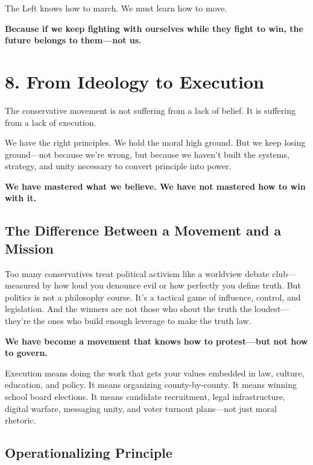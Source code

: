 The Left knows how to march. We must learn how to move.

\textbf{Because if we keep fighting with ourselves while they fight to win, the future belongs to them—not us.}














\section*{8. From Ideology to Execution}

The conservative movement is not suffering from a lack of belief. It is suffering from a lack of execution.

We have the right principles. We hold the moral high ground. But we keep losing ground—not because we’re wrong, but because we haven’t built the systems, strategy, and unity necessary to convert principle into power.

\textbf{We have mastered what we believe. We have not mastered how to win with it.}

\subsection*{The Difference Between a Movement and a Mission}

Too many conservatives treat political activism like a worldview debate club—measured by how loud you denounce evil or how perfectly you define truth. But politics is not a philosophy course. It’s a tactical game of influence, control, and legislation. And the winners are not those who shout the truth the loudest—they’re the ones who build enough leverage to make the truth law.

\textbf{We have become a movement that knows how to protest—but not how to govern.}

Execution means doing the work that gets your values embedded in law, culture, education, and policy. It means organizing county-by-county. It means winning school board elections. It means candidate recruitment, legal infrastructure, digital warfare, messaging unity, and voter turnout plans—not just moral rhetoric.

\subsection*{Operationalizing Principle}

